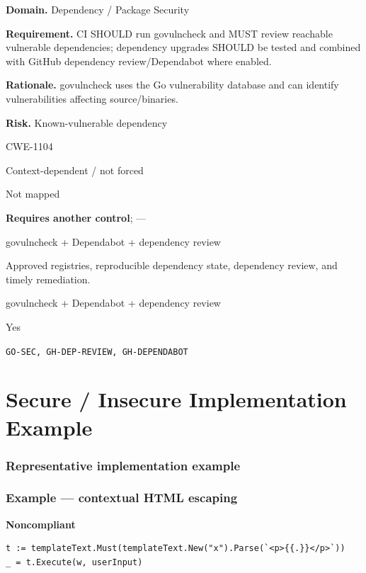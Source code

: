 \documentclass[10pt,letterpaper]{article}
\newcommand{\prioritybadge}[2]{\tcbox[on line,boxrule=0pt,arc=1.2mm,boxsep=0.7mm,left=1mm,right=1mm,top=0.4mm,bottom=0.4mm,colback=#2!12,coltext=#2]{\scriptsize\bfseries #1}}
\begin{document}
\begin{rulebox}[title={\texttt{SCS-GO-DEP-001} \hfill \prioritybadge{High Priority}{High}}]
\textbf{Domain.} Dependency / Package Security

\textbf{Requirement.} CI SHOULD run govulncheck and MUST review reachable vulnerable dependencies; dependency upgrades SHOULD be tested and combined with GitHub dependency review/Dependabot where enabled.

\textbf{Rationale.} govulncheck uses the Go vulnerability database and can identify vulnerabilities affecting source/binaries.

\textbf{Risk.} Known-vulnerable dependency

\begin{description}[leftmargin=2.65cm,labelwidth=2.3cm,style=nextline,itemsep=1pt,topsep=3pt]
  \item[CWE] CWE-1104
  \item[OWASP] Context-dependent / not forced
  \item[CERT] Not mapped
  \item[CodeQL] \textbf{Requires another control}; ---
  \item[Enforcement] govulncheck + Dependabot + dependency review
  \item[Prevention] Approved registries, reproducible dependency state, dependency review, and timely remediation.
  \item[Verification] govulncheck + Dependabot + dependency review
  \item[Automation] Yes
  \item[Sources] \texttt{GO-SEC, GH-DEP-REVIEW, GH-DEPENDABOT}
\end{description}
\end{rulebox}
\section{Secure / Insecure Implementation Example}
\subsubsection*{Representative implementation example}
\subsubsection*{Example --- contextual HTML escaping}

\textbf{Noncompliant}\par
\begin{lstlisting}
t := templateText.Must(templateText.New("x").Parse(`<p>{{.}}</p>`))
_ = t.Execute(w, userInput)
\end{lstlisting}
\end{document}
